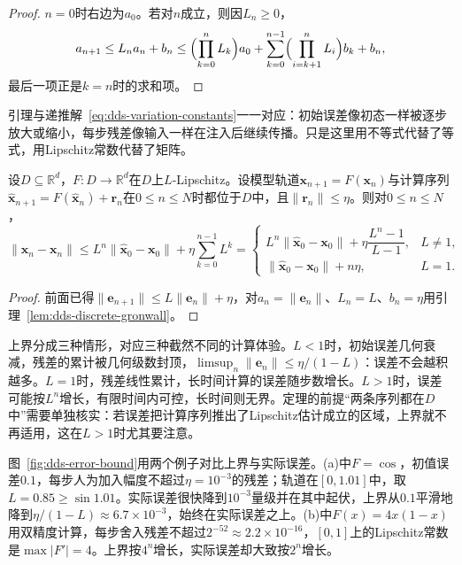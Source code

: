 \begin{proof}
$n=0$时右边为$a_0$。若对$n$成立，则因$L_n\geq0$，
\[
  a_{n+1}\leq L_na_n+b_n\leq\Bigl(\prod_{k=0}^{n}L_k\Bigr)a_0+\sum_{k=0}^{n-1}\Bigl(\prod_{i=k+1}^{n}L_i\Bigr)b_k+b_n ,
\]
最后一项正是$k=n$时的求和项。
\end{proof}

引理与递推解~\eqref{eq:dds-variation-constants}一一对应：初始误差像初态一样被逐步放大或缩小，每步残差像输入一样在注入后继续传播。只是这里用不等式代替了等式，用Lipschitz常数代替了矩阵。

\begin{theorem}[逐步计算误差的传播界]
\label{thm:dds-error-propagation}
设$D\subseteq\mathbb R^d$，$F:D\to\mathbb R^d$在$D$上$L$-Lipschitz。设模型轨道$\bm x_{n+1}=F(\bm x_n)$与计算序列$\hat{\bm x}_{n+1}=F(\hat{\bm x}_n)+\bm r_n$在$0\leq n\leq N$时都位于$D$中，且$\lVert\bm r_n\rVert\leq\eta$。则对$0\leq n\leq N$，
\begin{equation}
  \lVert\hat{\bm x}_n-\bm x_n\rVert\leq L^n\lVert\hat{\bm x}_0-\bm x_0\rVert+\eta\sum_{k=0}^{n-1}L^k
  =\begin{cases}
    L^n\lVert\hat{\bm x}_0-\bm x_0\rVert+\eta\dfrac{L^n-1}{L-1},&L\neq1,\\[1ex]
    \lVert\hat{\bm x}_0-\bm x_0\rVert+n\eta,&L=1.
  \end{cases}
  \label{eq:dds-error-propagation}
\end{equation}
\end{theorem}

\begin{proof}
前面已得$\lVert\bm e_{n+1}\rVert\leq L\lVert\bm e_n\rVert+\eta$，对$a_n=\lVert\bm e_n\rVert$、$L_n=L$、$b_n=\eta$用引理~\ref{lem:dds-discrete-gronwall}。
\end{proof}

上界分成三种情形，对应三种截然不同的计算体验。$L<1$时，初始误差几何衰减，残差的累计被几何级数封顶，$\limsup_n\lVert\bm e_n\rVert\leq\eta/(1-L)$：误差不会越积越多。$L=1$时，残差线性累计，长时间计算的误差随步数增长。$L>1$时，误差可能按$L^n$增长，有限时间内可控，长时间则无界。定理的前提“两条序列都在$D$中”需要单独核实：若误差把计算序列推出了Lipschitz估计成立的区域，上界就不再适用，这在$L>1$时尤其要注意。

图~\ref{fig:dds-error-bound}用两个例子对比上界与实际误差。(a)中$F=\cos$，初值误差$0.1$，每步人为加入幅度不超过$\eta=10^{-3}$的残差；轨道在$[0,1.01]$中，取$L=0.85\geq\sin1.01$。实际误差很快降到$10^{-3}$量级并在其中起伏，上界从$0.1$平滑地降到$\eta/(1-L)\approx6.7\times10^{-3}$，始终在实际误差之上。(b)中$F(x)=4x(1-x)$用双精度计算，每步舍入残差不超过$2^{-52}\approx2.2\times10^{-16}$，$[0,1]$上的Lipschitz常数是$\max|F'|=4$。上界按$4^n$增长，实际误差却大致按$2^n$增长。

